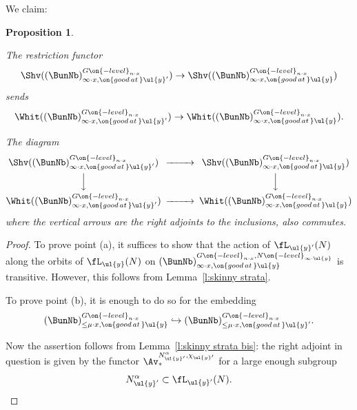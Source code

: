 \documentclass[9pt]{amsart}
\newtheorem{prop}[subsubsection]{Proposition}
\theoremstyle{definition}
\theoremstyle{remark}
\newcommand{\lemref}[1]{Lemma~\ref{#1}}
\numberwithin{equation}{section}
\begin{document}
\medskip

We claim:

\begin{prop}  \hfill \label{p:add point} 

\smallskip

The restriction functor 
$$\Shv((\BunNb)^{G\on{-level}_{n\cdot x}}_{\infty\cdot x,\on{good\,at\,}\ul{y}'})\to
\Shv((\BunNb)^{G\on{-level}_{n\cdot x}}_{\infty\cdot x,\on{good\,at\,}\ul{y}})$$
sends 
$$\Whit((\BunNb)^{G\on{-level}_{n\cdot x}}_{\infty\cdot x,\on{good\,at\,}\ul{y}'})\to
\Whit((\BunNb)^{G\on{-level}_{n\cdot x}}_{\infty\cdot x,\on{good\,at\,}\ul{y}}).$$

\smallskip

The diagram
$$
\CD
\Shv((\BunNb)^{G\on{-level}_{n\cdot x}}_{\infty\cdot x,\on{good\,at\,}\ul{y}'})   @>>> 
\Shv((\BunNb)^{G\on{-level}_{n\cdot x}}_{\infty\cdot x,\on{good\,at\,}\ul{y}})  \\
@VVV   @VVV   \\
\Whit((\BunNb)^{G\on{-level}_{n\cdot x}}_{\infty\cdot x,\on{good\,at\,}\ul{y}'})   @>>> 
\Whit((\BunNb)^{G\on{-level}_{n\cdot x}}_{\infty\cdot x,\on{good\,at\,}\ul{y}})  
\endCD
$$
where the vertical arrows are the right adjoints to the inclusions, also commutes.
\end{prop}

\begin{proof}

To prove point (a), it suffices to show that the action of $\fL_{\ul{y}'}(N)$ along the orbits of 
$\fL_{\ul{y}}(N)$ on $(\BunNb)^{G\on{-level}_{n\cdot x},N\on{-level}_{\infty\cdot \ul{y}}}_{\infty\cdot x,\on{good\,at\,}\ul{y}}$
is transitive. However, this follows from \lemref{l:skinny strata}. 

\medskip

To prove point (b), it is enough to do so for the embedding
$$(\BunNb)^{G\on{-level}_{n\cdot x}}_{\leq \mu\cdot x,\on{good\,at\,}\ul{y}}\hookrightarrow
(\BunNb)^{G\on{-level}_{n\cdot x}}_{\leq \mu\cdot x,\on{good\,at\,}\ul{y}'}.$$

\medskip

Now the assertion follows from \lemref{l:skinny strata bis}: the right adjoint in question is given by the functor
$\Av_*^{N^{\alpha}_{\ul{y}'},\chi_{\ul{y}'}}$ for a large enough subgroup 
$$N^{\alpha}_{\ul{y}'}\subset \fL_{\ul{y}'}(N).$$

\end{proof}

\sssec{}
\end{document}
